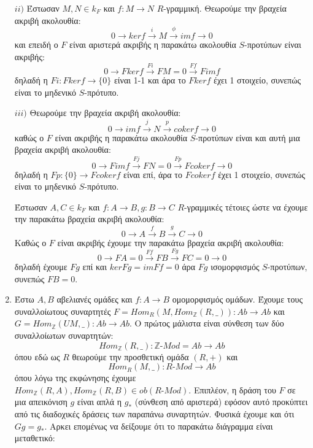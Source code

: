 \documentclass{article}
\begin{document}
\begin{enumerate}
	$ii)$ Έστωσαν $M,N \in k_F$ και $f: M \rightarrow N$ $R$-γραμμική. Θεωρούμε την βραχεία ακριβή ακολουθία:
	$$0 \rightarrow kerf \xrightarrow{i} M \xrightarrow{\phi} imf \rightarrow 0$$
	και επειδή ο $F$ είναι αριστερά ακριβής η παρακάτω ακολουθία $S$-προτύπων είναι ακριβής:
	$$0\rightarrow Fkerf \xrightarrow{Fi} FM = 0 \xrightarrow{Ff} Fimf$$
	δηλαδή η $Fi:Fkerf \rightarrow \{ 0 \} $ είναι 1-1 και άρα το $Fkerf$ έχει 1 στοιχείο, συνεπώς είναι το μηδενικό $S$-πρότυπο.
	$ $\newline

	$iii)$ Θεωρούμε την βραχεία ακριβή ακολουθία:
	$$0 \rightarrow imf \xrightarrow{j} N \xrightarrow{p} cokerf \rightarrow 0$$
	καθώς ο $F$ είναι ακριβής η παρακάτω ακολουθία $S$-προτύπων είναι και αυτή μια βραχεία ακριβή ακολουθία:
	$$0\rightarrow Fimf \xrightarrow{Fj} FN = 0 \xrightarrow{Fp} Fcokerf \rightarrow 0$$
	δηλαδή η $Fp : \{0\} \rightarrow Fcokerf $ είναι επί, άρα το $Fcokerf$ έχει 1 στοιχείο, συνεπώς είναι το μηδενικό $S$-πρότυπο.
	$ $\newline
	
	Έστωσαν $A,C \in k_F$ και $f:A\rightarrow B, g:B \rightarrow C$ $R$-γραμμικές τέτοιες ώστε να έχουμε την παρακάτω βραχεία ακριβή ακολουθία:
	$$0\rightarrow A \xrightarrow{f} B \xrightarrow{g} C \rightarrow 0$$
	Καθώς ο $F$ είναι ακριβής έχουμε την παρακάτω βραχεία ακριβή ακολουθία:
	$$0 \rightarrow FA = 0 \xrightarrow{Ff} FB \xrightarrow{Fg} FC=0 \rightarrow 0$$
	δηλαδή έχουμε $Fg$ επί και $kerFg=imFf=0$ άρα $Fg$ ισομορφισμός $S$-προτύπων, συνεπώς $FB=0$.
	$ $\newline

\item Έστω $A,B$ αβελιανές ομάδες και $f: A \rightarrow B$ ομομορφισμός ομάδων. Έχουμε τους συναλλοίωτους συναρτητές $F=Hom_R (M, Hom_{\mathbb{Z}}(R,\_ )): Ab \rightarrow Ab$ και $G=Hom_{\mathbb{Z}} (UM,\_ ): Ab \rightarrow Ab$. Ο πρώτος μάλιστα είναι σύνθεση των δύο συναλλοίωτων συναρτητών:
	$$ Hom_{\mathbb{Z}}(R, \_ ) : \mathbb{Z}\text{-}Mod = Ab \rightarrow Ab$$
	όπου εδώ ως $R$ θεωρούμε την προσθετική ομάδα $(R,+)$ και
	$$Hom_R (M , \_ ): R\text{-}Mod \rightarrow Ab $$
	όπου λόγω της εκφώνησης έχουμε $Hom_{\mathbb{Z}} (R,A), Hom_{\mathbb{Z}} (R,B) \in ob(R\text{-}Mod)$. Επιπλέον, η δράση του $F$ σε μια απεικόνιση $g$ είναι απλά η $g_*$ (σύνθεση από αριστερά) εφόσον αυτό προκύπτει από τις διαδοχικές δράσεις των παραπάνω συναρτητών. Φυσικά έχουμε και ότι $Gg = g_*$.
	Αρκει επομένως να δείξουμε ότι το παρακάτω διάγραμμα είναι μεταθετικό:

	\begin{center}
	\end{center}


\end{enumerate}
\end{document}
